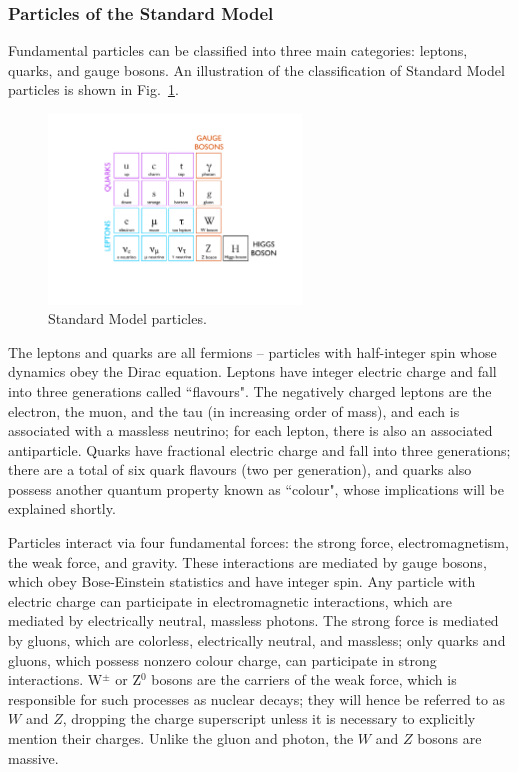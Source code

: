 \subsubsection{Particles of the Standard Model\label{sec:SM-particles}}

Fundamental particles can be classified into three main categories: leptons, quarks, and gauge bosons. An illustration of the classification of Standard Model particles is shown in Fig.~\ref{fig:StandardModelTable}.

\begin{figure}
   \begin{center}
      \includegraphics[width=0.6\textwidth]{figures/StandardModelTable}
      \caption{Standard Model particles.}
      \label{fig:StandardModelTable}
   \end{center}
\end{figure}

The leptons and quarks are all fermions -- particles with half-integer spin whose dynamics obey the Dirac equation. Leptons have integer electric charge and fall into three generations called ``flavours". The negatively charged leptons are the electron, the muon, and the tau (in increasing order of mass), and each is associated with a massless neutrino; for each lepton, there is also an associated antiparticle. Quarks have fractional electric charge and fall into three generations; there are a total of six quark flavours (two per generation), and quarks also possess another quantum property known as ``colour", whose implications will be explained shortly.

Particles interact via four fundamental forces: the strong force, electromagnetism, the weak force, and gravity. These interactions are mediated by gauge bosons, which obey Bose-Einstein statistics and have integer spin. Any particle with electric charge can participate in electromagnetic interactions, which are mediated by electrically neutral, massless photons. The strong force is mediated by gluons, which are colorless, electrically neutral, and massless; only quarks and gluons, which possess nonzero colour charge, can participate in strong interactions. W$^{\pm}$ or Z$^{0}$ bosons are the carriers of the weak force, which is responsible for such processes as nuclear decays; they will hence be referred to as $W$ and $Z$, dropping the charge superscript unless it is necessary to explicitly mention their charges. Unlike the gluon and photon, the $W$ and $Z$ bosons are massive.

